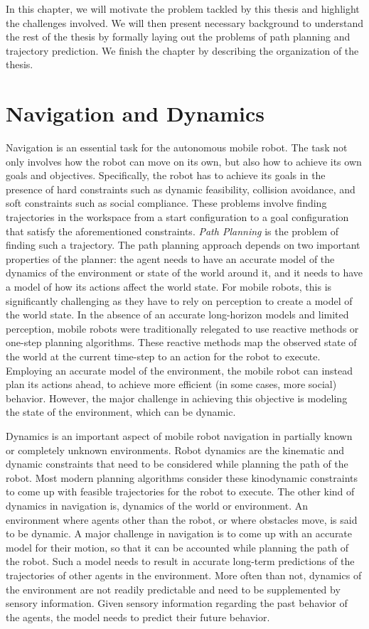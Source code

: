 In this chapter, we will motivate the problem tackled by this thesis and highlight the challenges involved. We will then present necessary background to understand the rest of the thesis by formally laying out the problems of path planning and trajectory prediction. We finish the chapter by describing the organization of the thesis. 

\section{Navigation and Dynamics}
\label{sec:intro-motivation}

Navigation is an essential task for the autonomous mobile robot. The task not only involves how the robot can move on its own, but also how to achieve its own goals and objectives. Specifically, the robot has to achieve its goals in the presence of hard constraints such as dynamic feasibility, collision avoidance, and soft constraints such as social compliance. These problems involve finding trajectories in the workspace from a start configuration to a goal configuration that satisfy the aforementioned constraints. \textit{Path Planning} is the problem of finding such a trajectory. The path planning approach depends on two important properties of the planner: the agent needs to have an accurate model of the dynamics of the environment or state of the world around it, and it needs to have a model of how its actions affect the world state. For mobile robots, this is significantly challenging as they have to rely on perception to create a model of the world state. In the absence of an accurate long-horizon models and limited perception, mobile robots were traditionally relegated to use reactive methods or one-step planning algorithms. These reactive methods map the observed state of the world at the current time-step to an action for the robot to execute. Employing an accurate model of the environment, the mobile robot can instead plan its actions ahead, to achieve more efficient (in some cases, more social) behavior. However, the major challenge in achieving this objective is modeling the state of the environment, which can be dynamic.

Dynamics is an important aspect of mobile robot navigation in partially known or completely unknown environments. Robot dynamics are the kinematic and dynamic constraints that need to be considered while planning the path of the robot. Most modern planning algorithms consider these kinodynamic constraints to come up with feasible trajectories for the robot to execute. The other kind of dynamics in navigation is, dynamics of the world or environment. An environment where agents other than the robot, or where obstacles move, is said to be dynamic. A major challenge in navigation is to come up with an accurate model for their motion, so that it can be accounted while planning the path of the robot. Such a model needs to result in accurate long-term predictions of the trajectories of other agents in the environment. More often than not, dynamics of the environment are not readily predictable and need to be supplemented by sensory information. Given sensory information regarding the past behavior of the agents, the model needs to predict their future behavior.

